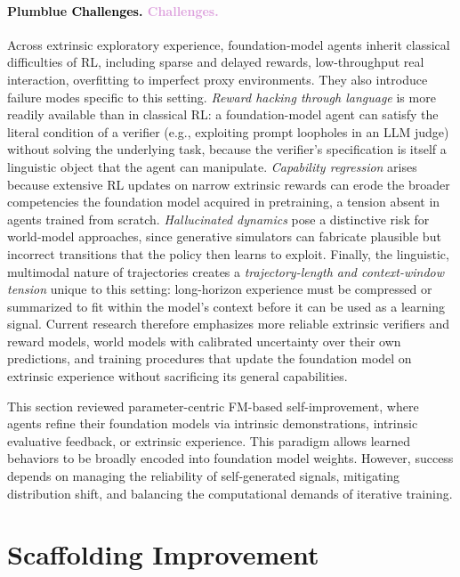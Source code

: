 \documentclass{article}
\let\oldtextcolor\textcolor
\renewcommand{\textcolor}[2]{
  \def\temp{#1}
  \def\red{blue}
  \ifx\temp\red
    \oldtextcolor{black}{#2}
  \else
    \oldtextcolor{#1}{#2}
  \fi
}
\begin{document}
\paragraph{\textcolor{Plum}{Challenges.}} Across extrinsic exploratory experience, foundation-model agents inherit classical difficulties of RL, including sparse and delayed rewards, low-throughput real interaction, overfitting to imperfect proxy environments. They also introduce failure modes specific to this setting. \textit{Reward hacking through language} is more readily available than in classical RL: a foundation-model agent can satisfy the literal condition of a verifier (e.g., exploiting prompt loopholes in an LLM judge) without solving the underlying task, because the verifier's specification is itself a linguistic object that the agent can manipulate. \textit{Capability regression} arises because extensive RL updates on narrow extrinsic rewards can erode the broader competencies the foundation model acquired in pretraining, a tension absent in agents trained from scratch. \textit{Hallucinated dynamics} pose a distinctive risk for world-model approaches, since generative simulators can fabricate plausible but incorrect transitions that the policy then learns to exploit. Finally, the linguistic, multimodal nature of trajectories creates a \textit{trajectory-length and context-window tension} unique to this setting: long-horizon experience must be compressed or summarized to fit within the model's context before it can be used as a learning signal. Current research therefore emphasizes more reliable extrinsic verifiers and reward models, world models with calibrated uncertainty over their own predictions, and training procedures that update the foundation model on extrinsic experience without sacrificing its general capabilities.

\begin{ttcolorbox}[Takeaway]
This section reviewed parameter-centric FM-based self-improvement, where agents refine their foundation models via intrinsic demonstrations, intrinsic evaluative feedback, or extrinsic experience. This paradigm allows learned behaviors to be broadly encoded into foundation model weights. However, success depends on managing the reliability of self-generated signals, mitigating distribution shift, and balancing the computational demands of iterative training.
\end{ttcolorbox}


\section{Scaffolding Improvement}
\label{sec:Scaffolding_Improvement}
\end{document}
